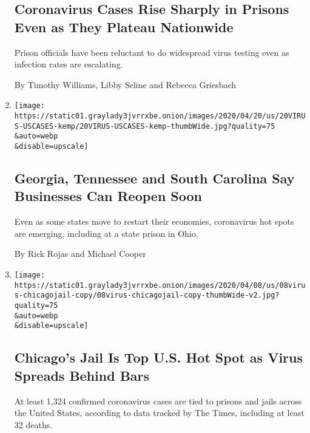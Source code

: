 \begin{enumerate}
{  \subsection{Coronavirus Cases Rise Sharply in Prisons Even as They
  Plateau
  Nationwide}\label{coronavirus-cases-rise-sharply-in-prisons-even-as-they-plateau-nationwide}}

  Prison officials have been reluctant to do widespread virus testing
  even as infection rates are escalating.

  By Timothy Williams, Libby Seline and Rebecca Griesbach
\item
  \href{/2020/04/20/us/coronavirus-us-hot-spots-reopening.html}{}

  \texttt{[image: https://static01.graylady3jvrrxbe.onion/images/2020/04/20/us/20VIRUS-USCASES-kemp/20VIRUS-USCASES-kemp-thumbWide.jpg?quality=75\\\&auto=webp\\\&disable=upscale]}

  \hypertarget{georgia-tennessee-and-south-carolina-say-businesses-can-reopen-soon}{%
  \subsection{Georgia, Tennessee and South Carolina Say Businesses Can
  Reopen
  Soon}\label{georgia-tennessee-and-south-carolina-say-businesses-can-reopen-soon}}

  Even as some states move to restart their economies, coronavirus hot
  spots are emerging, including at a state prison in Ohio.

  By Rick Rojas and Michael Cooper
\item
  \href{/2020/04/08/us/coronavirus-cook-county-jail-chicago.html}{}

  \texttt{[image: https://static01.graylady3jvrrxbe.onion/images/2020/04/08/us/08virus-chicagojail-copy/08virus-chicagojail-copy-thumbWide-v2.jpg?quality=75\\\&auto=webp\\\&disable=upscale]}

  \hypertarget{chicagos-jail-is-top-us-hot-spot-as-virus-spreads-behind-bars}{%
  \subsection{Chicago's Jail Is Top U.S. Hot Spot as Virus Spreads
  Behind
  Bars}\label{chicagos-jail-is-top-us-hot-spot-as-virus-spreads-behind-bars}}

  At least 1,324 confirmed coronavirus cases are tied to prisons and
  jails across the United States, according to data tracked by The
  Times, including at least 32 deaths.


\end{enumerate}
